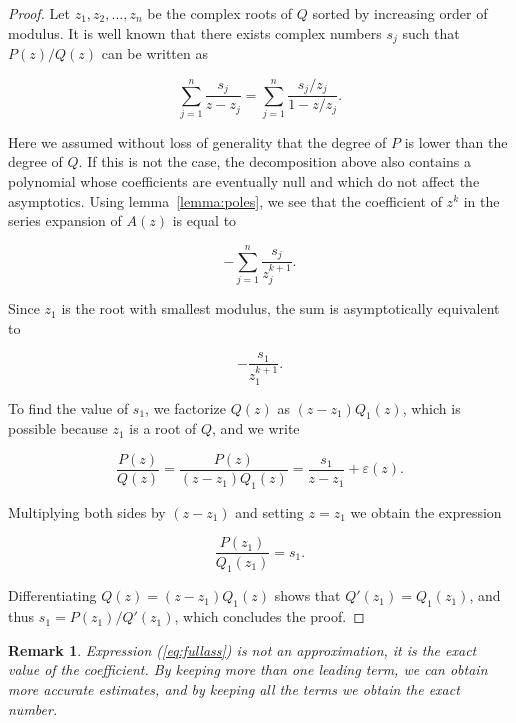 \documentclass{article}
\newtheorem{remark}{Remark}
\begin{document}
\begin{proof}
Let $z_1, z_2, \ldots, z_n$ be the complex roots of $Q$ sorted by
increasing order of modulus. It is well known that there exists complex
numbers $s_j$ such that $P(z)/Q(z)$ can be written as

\begin{equation}
\sum_{j=1}^n \frac{s_j}{z-z_j} =
\sum_{j=1}^n \frac{s_j/z_j}{1-z/z_j}.
\end{equation}

Here we assumed without loss of generality that the degree of $P$ is lower
than the degree of $Q$. If this is not the case, the decomposition above
also contains a polynomial whose coefficients are eventually null and
which do not affect the asymptotics. Using lemma~\ref{lemma:poles}, we see
that the coefficient of $z^k$ in the series expansion of $A(z)$ is equal
to

\begin{equation}
\label{eq:fullass}
-\sum_{j=1}^n \frac{s_j}{z_j^{k+1}}.
\end{equation}

Since $z_1$ is the root with smallest modulus, the sum is asymptotically
equivalent to

\begin{equation*}
-\frac{s_1}{z_1^{k+1}}.
\end{equation*}

To find the value of $s_1$, we factorize $Q(z)$ as
$(z-z_1)Q_1(z)$, which is possible because $z_1$ is a root of $Q$,
and we write

\begin{equation*}
\frac{P(z)}{Q(z)} =
\frac{P(z)}{(z-z_1)Q_1(z)} = \frac{s_1}{z-z_1} +
\varepsilon(z).
\end{equation*}

Multiplying both sides by $(z-z_1)$ and setting $z = z_1$ we obtain
the expression

\begin{equation*}
\frac{P(z_1)}{Q_1(z_1)} = s_1.
\end{equation*}

Differentiating $Q(z) = (z-z_1)Q_1(z)$ shows that $Q'(z_1) =
Q_1(z_1)$, and thus $s_1 = P(z_1) / Q'(z_1)$, which concludes the proof.
\end{proof}

\begin{remark}
Expression (\ref{eq:fullass}) is not an approximation, it is the exact
value of the coefficient. By keeping more than one leading term, we can
obtain more accurate estimates, and by keeping all the terms we obtain the
exact number.
\end{remark}
\end{document}

